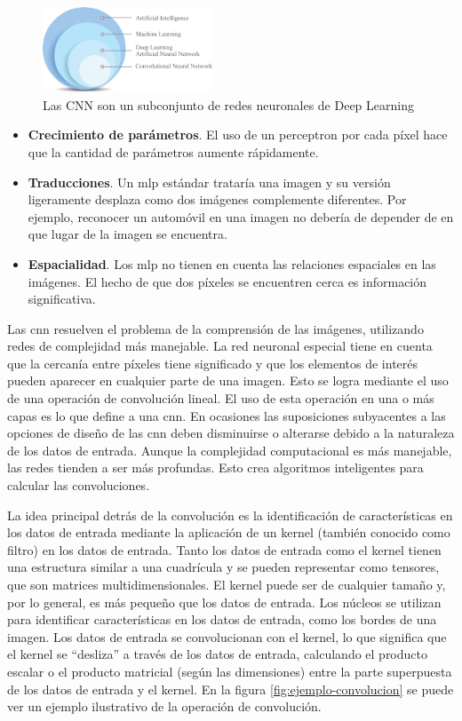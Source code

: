 \begin{figure}[ht]
\centering
\includegraphics[width=0.45\textwidth]{img/chapters/estado-del-arte/cnn-radiologic.png}
\caption{\label{fig:cnn-dlnn}Las CNN son un subconjunto de redes neuronales de Deep Learning \cite{ankile2020deep}}
\end{figure}

\begin{itemize}
    \item \textbf{Crecimiento de parámetros}. El uso de un perceptron por cada píxel hace que la cantidad de parámetros aumente rápidamente.
    \item \textbf{Traducciones}. Un \gls{mlp} estándar trataría una imagen y su versión ligeramente desplaza como dos imágenes complemente diferentes. Por ejemplo, reconocer un automóvil en una imagen no debería de depender de en que lugar de la imagen se encuentra.
    \item \textbf{Espacialidad}. Los \gls{mlp} no tienen en cuenta las relaciones espaciales en las imágenes. El hecho de que dos píxeles se encuentren cerca es información significativa.
\end{itemize}

Las \gls{cnn} resuelven el problema de la comprensión de las imágenes, utilizando redes de complejidad más manejable. La red neuronal especial tiene en cuenta que la cercanía entre píxeles tiene significado y que los elementos de interés pueden aparecer en cualquier parte de una imagen. Esto se logra mediante el uso de una operación de convolución lineal. El uso de esta operación en una o más capas es lo que define a una \gls{cnn}. En ocasiones las suposiciones subyacentes a las opciones de diseño de las \gls{cnn} deben disminuirse o alterarse debido a la naturaleza de los datos de entrada. Aunque la complejidad computacional es más manejable, las redes tienden a ser más profundas. Esto crea algoritmos inteligentes para calcular las convoluciones.

La idea principal detrás de la convolución es la identificación de características en los datos de entrada mediante la aplicación de un kernel (también conocido como filtro) en los datos de entrada. Tanto los datos de entrada como el kernel tienen una estructura similar a una cuadrícula y se pueden representar como tensores, que son matrices multidimensionales. El kernel puede ser de cualquier tamaño y, por lo general, es más pequeño que los datos de entrada. Los núcleos se utilizan para identificar características en los datos de entrada, como los bordes de una imagen. Los datos de entrada se convolucionan con el kernel, lo que significa que el kernel se ``desliza'' a través de los datos de entrada, calculando el producto escalar o el producto matricial (según las dimensiones) entre la parte superpuesta de los datos de entrada y el kernel. En la figura \ref{fig:ejemplo-convolucion} se puede ver un ejemplo ilustrativo de la operación de convolución.


